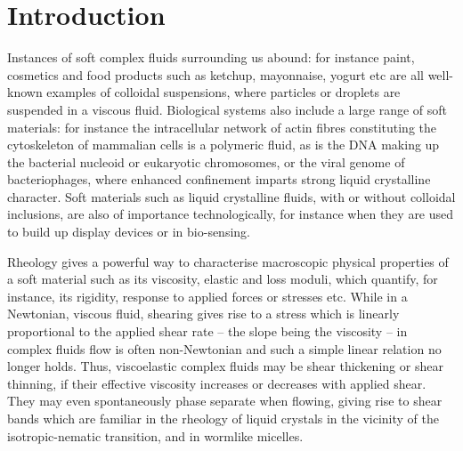 \documentclass[8.5pt,twoside,twocolumn]{article}
\begin{document}


\section{Introduction}
Instances of soft complex fluids surrounding us abound: for instance paint, cosmetics and food products such as ketchup, mayonnaise, yogurt etc are all well-known examples of colloidal suspensions, where particles or droplets are suspended in a viscous fluid. Biological systems also include a large range of soft materials: for instance the intracellular network of actin fibres constituting the cytoskeleton of mammalian cells is a polymeric fluid, as is the DNA making up the bacterial nucleoid or eukaryotic chromosomes, or the viral genome of bacteriophages, where enhanced confinement imparts strong liquid crystalline character. Soft materials such as liquid crystalline fluids, with or without colloidal inclusions, are also of importance technologically, for instance when they are used to build up display devices or in bio-sensing.

Rheology gives a powerful way to characterise macroscopic physical properties of a soft material such as its viscosity, elastic and loss moduli, which quantify, for instance, its rigidity, response to applied forces or stresses etc. While in a Newtonian, viscous fluid, shearing gives rise to a stress which is linearly proportional to the applied shear rate -- the slope being the viscosity -- in complex fluids flow is often non-Newtonian and such a simple linear relation no longer holds. Thus, viscoelastic complex fluids may be shear thickening or shear thinning, if their effective viscosity increases or decreases with applied shear. They may even spontaneously phase separate when flowing, giving rise to shear bands which are familiar in the rheology of liquid crystals in the vicinity of the isotropic-nematic transition, and in wormlike micelles.
\end{document}
